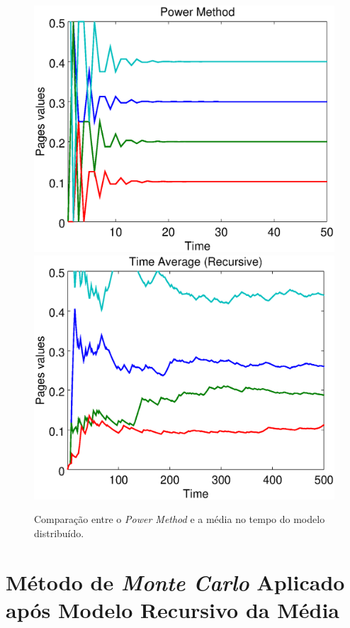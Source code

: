 \
\begin{figure}[!htb]
	\centering
	\includegraphics[scale=0.35]{imagens/powermethod}
	\hspace{0.1cm}
	\includegraphics[scale=0.35]{imagens/timerecursive}
	\caption{Comparação entre o \textit{Power Method} e a média no tempo do modelo distribuído.}
	\label{powertime}
\end{figure}


\section{Método de \textit{Monte Carlo} Aplicado após Modelo Recursivo da Média}%

